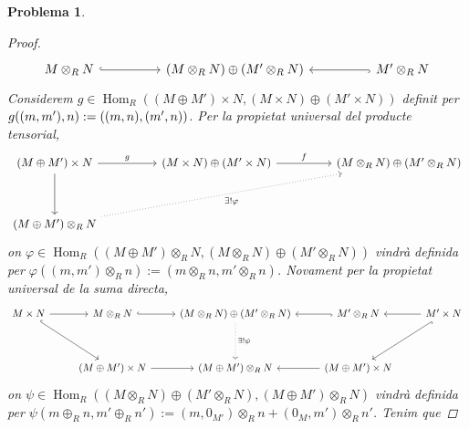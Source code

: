\documentclass[compress]{article}
\newtheorem{problema}{Problema}
\theoremstyle{definition}
\DeclareMathOperator{\Hom}{Hom}
\begin{document}
\begin{problema}
\begin{enumerate}
\begin{proof}
\begin{equation*}
\begin{tikzcd}
                M\otimes_{R}N
                \arrow[hook]{rr}
                &&(M\otimes_{R}N)\oplus(M'\otimes_{R}N)
                &&M'\otimes_{R}N
                \arrow[hook]{ll}
            \end{tikzcd}
            \end{equation*}
            Considerem $g\in\Hom_{R}((M\oplus M')\times N,(M\times N)\oplus(M'\times N))$ definit per $g((m,m'),n):=((m,n),(m',\newline n))$. Per la propietat universal del producte tensorial,
            \begin{equation*}
            \begin{tikzcd}
                (M\oplus M')\times N
                \arrow{rr}{g}
                \arrow{dd}
                &&(M\times N)\oplus(M'\times N)
                \arrow{rr}{f}
                &&(M\otimes_{R}N)\oplus(M'\otimes_{R}N)\\\\
                (M\oplus M')\otimes_{R}N
                \arrow[swap, dotted]{uurrrr}{\exists!\varphi}
            \end{tikzcd}
            \end{equation*}
            on $\varphi\in\Hom_{R}((M\oplus M')\otimes_{R}N,(M\otimes_{R}N)\oplus(M'\otimes_{R}N))$ vindrà definida per $\varphi((m,m')\otimes_{R}n):=(m\otimes_{R}n,m'\otimes_{R}n)$. Novament per la propietat universal de la suma directa,
            \begin{equation*}
            \begin{tikzcd}
                M\times N
                \arrow{r}
                \arrow[hook]{ddr}
                &M\otimes_{R}N
                \arrow[hook]{r}
                &(M\otimes_{R}N)\oplus(M'\otimes_{R}N)
                \arrow[dotted]{dd}{\exists!\psi}
                &M'\otimes_{R}N
                \arrow[hook]{l}
                &M'\times N
                \arrow{l}
                \arrow[hook]{ddl}\\\\
                &(M\oplus M')\times N
                \arrow{r}
                &(M\oplus M')\otimes_{R}N
                &(M\oplus M')\times N
                \arrow{l}&
            \end{tikzcd}    
            \end{equation*}
            on $\psi\in\Hom_{R}((M\otimes_{R}N)\oplus(M'\otimes_{R}N),(M\oplus M')\otimes_{R}N)$ vindrà definida per $\psi(m\oplus_{R}n,m'\oplus_{R}n'):=(m,0_{M'})\otimes_{R}n+(0_{M},m')\otimes_{R}n'$. Tenim que

\end{proof}
\end{enumerate}
\end{problema}
\end{document}
